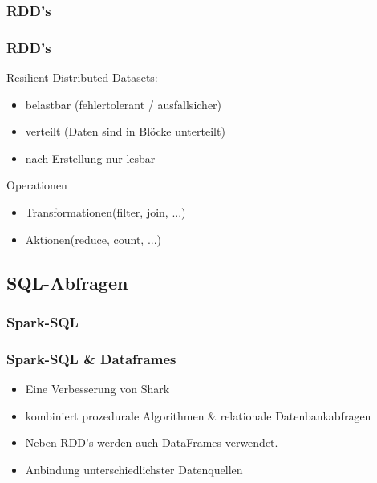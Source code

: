 \documentclass[hyperref={pdfpagelabels=false}]{beamer}
\begin{document}
\subsubsection{RDD’s}
\begin{frame} [t]
\frametitle{RDD’s}

Resilient Distributed Datasets:
\begin{itemize}
	\item belastbar (fehlertolerant / ausfallsicher)
	\item verteilt (Daten sind in Blöcke unterteilt)
	\item nach Erstellung nur lesbar	
\end{itemize}

\vspace{0.4cm}

Operationen
\begin{itemize}
	\item Transformationen(filter, join, ...)
	\item Aktionen(reduce, count, ...)
\end{itemize}

\end{frame}


\subsection{SQL-Abfragen}
\subsubsection{Spark-SQL}
\begin{frame} [t]
\frametitle{Spark-SQL \& Dataframes}
\begin{itemize}
	\item Eine Verbesserung von Shark
	\item kombiniert prozedurale Algorithmen \& relationale Datenbankabfragen
	\item Neben RDD's werden auch DataFrames verwendet.
	\item Anbindung unterschiedlichster Datenquellen
\end{itemize}
\end{frame}
\end{document}

